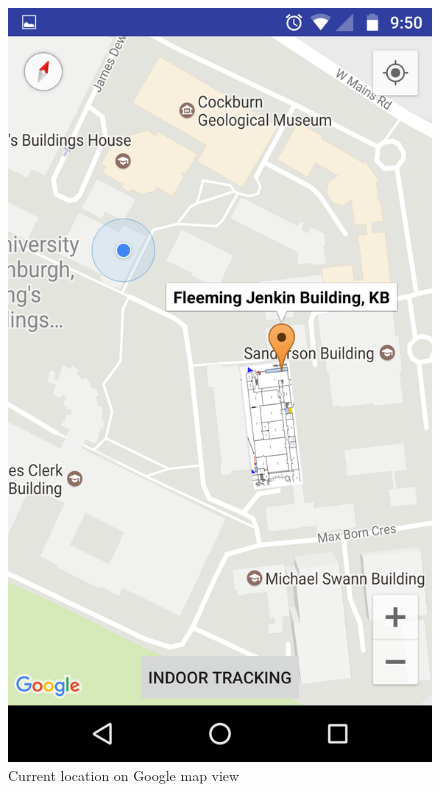 \documentclass[10.8pt]{article}
\begin{document}
\begin{figure}[H]
\begin{minipage}[b]{.3\textwidth}
        \includegraphics[scale=1.2, width=\linewidth]{pic1.png}  
        \caption{Current location on Google map view}  
    \end{minipage} 
    \hfill
    \begin{minipage}[b]{.3\textwidth}  
        \centering  

\end{minipage}
\end{figure}
\end{document}
